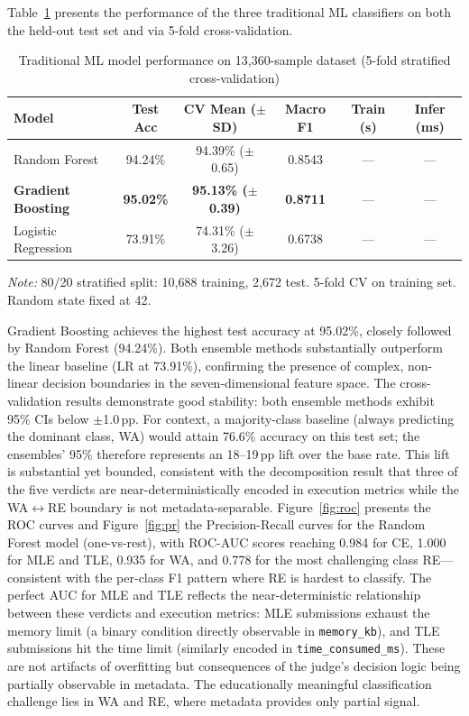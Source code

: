 \documentclass[acmsmall]{acmart}
\begin{document}
Table~\ref{tab:ml-results} presents the performance of the three traditional
ML classifiers on both the held-out test set and via 5-fold cross-validation.

\begin{table}[htbp]
\centering
\caption{Traditional ML model performance on 13,360-sample dataset
 (5-fold stratified cross-validation)}
\label{tab:ml-results}
\begin{tabular}{@{}lccccc@{}}
\toprule
Model & Test Acc & CV Mean ($\pm$SD) & Macro F1 & Train (s) & Infer (ms) \\
\midrule
Random Forest & 94.24\% & 94.39\% ($\pm$0.65) & 0.8543 & --- & --- \\
\textbf{Gradient Boosting} & \textbf{95.02\%} & \textbf{95.13\% ($\pm$0.39)} & \textbf{0.8711} & --- & --- \\
Logistic Regression & 73.91\% & 74.31\% ($\pm$3.26) & 0.6738 & --- & --- \\
\bottomrule
\end{tabular}

\vspace{2mm}
{\small \textit{Note:} 80/20 stratified split: 10,688 training, 2,672 test.
5-fold CV on training set. Random state fixed at 42.}
\end{table}

Gradient Boosting achieves the highest test accuracy at 95.02\%, closely
followed by Random Forest (94.24\%). Both ensemble methods substantially
outperform the linear baseline (LR at 73.91\%), confirming the presence of
complex, non-linear decision boundaries in the seven-dimensional feature
space. The cross-validation results demonstrate good stability: both ensemble
methods exhibit 95\% CIs below $\pm$1.0\,pp. For context, a
majority-class baseline (always predicting the dominant class, WA) would
attain 76.6\% accuracy on this test set; the ensembles' 95\% therefore
represents an 18--19\,pp lift over the base rate. This lift is substantial
yet bounded, consistent with the decomposition result that three of the five
verdicts are near-deterministically encoded in execution metrics while the
WA$\leftrightarrow$RE boundary is not metadata-separable.
Figure~\ref{fig:roc} presents the ROC curves and Figure~\ref{fig:pr} the
Precision-Recall curves for the Random Forest model (one-vs-rest), with
ROC-AUC scores reaching 0.984 for CE, 1.000 for MLE and TLE, 0.935 for WA,
and 0.778 for the most challenging class RE---consistent with the per-class F1
pattern where RE is hardest to classify. The perfect AUC for MLE and TLE reflects
the near-deterministic relationship between these verdicts and execution metrics:
MLE submissions exhaust the memory limit (a binary condition directly observable
in \texttt{memory\_kb}), and TLE submissions hit the time limit (similarly encoded
in \texttt{time\_consumed\_ms}). These are not artifacts of overfitting but
consequences of the judge's decision logic being partially observable in metadata.
The educationally meaningful classification challenge lies in WA and RE, where
metadata provides only partial signal.
\end{document}
